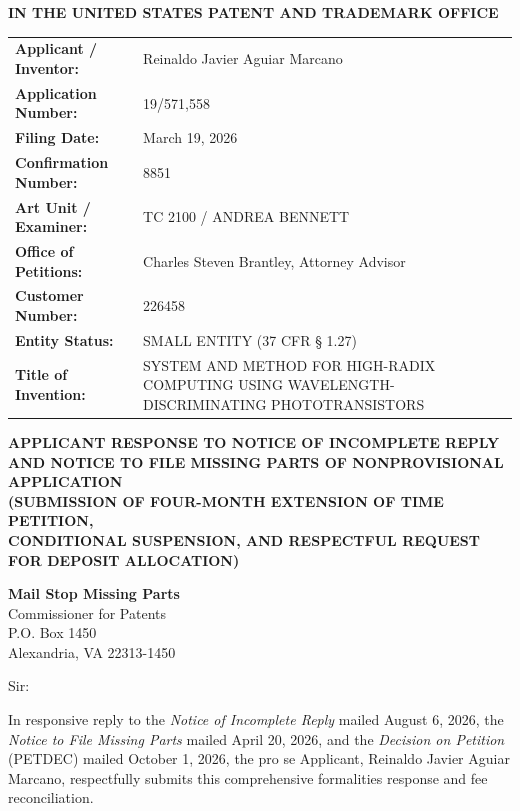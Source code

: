 \documentclass[11pt,letterpaper]{article}
\begin{document}
\thispagestyle{empty}

\begin{center}
    \textbf{\large IN THE UNITED STATES PATENT AND TRADEMARK OFFICE}
\end{center}

\vspace{0.3cm}
\noindent\begin{tabular}{p{2.3in}p{4.0in}}
\textbf{Applicant / Inventor:} & Reinaldo Javier Aguiar Marcano \\
\textbf{Application Number:} & 19/571,558 \\
\textbf{Filing Date:} & March 19, 2026 \\
\textbf{Confirmation Number:} & 8851 \\
\textbf{Art Unit / Examiner:} & TC 2100 / ANDREA BENNETT \\
\textbf{Office of Petitions:} & Charles Steven Brantley, Attorney Advisor \\
\textbf{Customer Number:} & 226458 \\
\textbf{Entity Status:} & SMALL ENTITY (37 CFR \S{} 1.27) \\
\textbf{Title of Invention:} & SYSTEM AND METHOD FOR HIGH-RADIX COMPUTING USING WAVELENGTH-DISCRIMINATING PHOTOTRANSISTORS \\
\end{tabular}

\vspace{0.4cm}
\begin{center}
    \textbf{\large APPLICANT RESPONSE TO NOTICE OF INCOMPLETE REPLY \\
    AND NOTICE TO FILE MISSING PARTS OF NONPROVISIONAL APPLICATION} \\
    \textbf{\normalsize (SUBMISSION OF FOUR-MONTH EXTENSION OF TIME PETITION, \\
    CONDITIONAL SUSPENSION, AND RESPECTFUL REQUEST FOR DEPOSIT ALLOCATION)}
\end{center}

\noindent\textbf{Mail Stop Missing Parts} \\
Commissioner for Patents \\
P.O. Box 1450 \\
Alexandria, VA 22313-1450

\vspace{0.2cm}
Sir:

In responsive reply to the \textit{Notice of Incomplete Reply} mailed August 6, 2026, the \textit{Notice to File Missing Parts} mailed April 20, 2026, and the \textit{Decision on Petition} (PETDEC) mailed October 1, 2026, the pro se Applicant, Reinaldo Javier Aguiar Marcano, respectfully submits this comprehensive formalities response and fee reconciliation.
\end{document}
